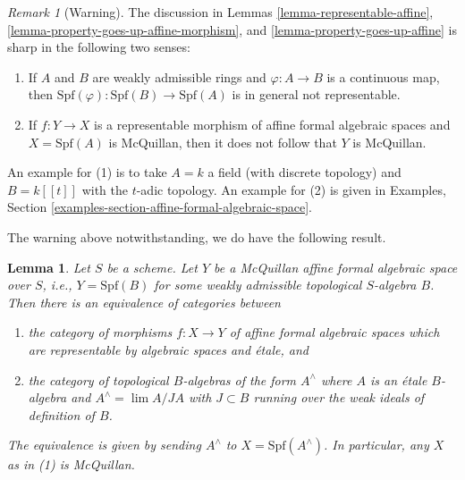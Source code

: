\documentclass{stacks-project}
\theoremstyle{plain}
\newtheorem{lemma}[subsection]{Lemma}
\theoremstyle{definition}
\theoremstyle{remark}
\newtheorem{remark}[subsection]{Remark}
\numberwithin{equation}{subsection}
\def\lim{\mathop{\mathrm{lim}}\nolimits}
\begin{document}
\begin{remark}[Warning]
\label{remark-warning}
The discussion in Lemmas \ref{lemma-representable-affine},
\ref{lemma-property-goes-up-affine-morphism}, and
\ref{lemma-property-goes-up-affine}
is sharp in the following two senses:
\begin{enumerate}
\item If $A$ and $B$ are weakly admissible rings and $\varphi : A \to B$
is a continuous map, then
$\text{Spf}(\varphi) : \text{Spf}(B) \to \text{Spf}(A)$ is in general
not representable.
\item If $f : Y \to X$ is a representable morphism of affine
formal algebraic spaces and $X = \text{Spf}(A)$ is McQuillan,
then it does not follow that $Y$ is McQuillan.
\end{enumerate}
An example for (1) is to take $A = k$ a field (with discrete topology)
and $B = k[[t]]$ with the $t$-adic topology.
An example for (2) is given in
Examples, Section \ref{examples-section-affine-formal-algebraic-space}.
\end{remark}

\noindent
The warning above notwithstanding, we do have the following result.

\begin{lemma}
\label{lemma-etale}
Let $S$ be a scheme. Let $Y$ be a McQuillan affine formal algebraic space
over $S$, i.e., $Y = \text{Spf}(B)$ for some weakly admissible topological
$S$-algebra $B$. Then there is an equivalence of categories between
\begin{enumerate}
\item the category of morphisms $f : X \to Y$
of affine formal algebraic spaces which are representable
by algebraic spaces and \'etale, and
\item the category of topological $B$-algebras of the form
$A^\wedge$ where $A$ is an \'etale $B$-algebra and
$A^\wedge = \lim A/JA$ with $J \subset B$ running over the
weak ideals of definition of $B$.
\end{enumerate}
The equivalence is given by sending $A^\wedge$ to  $X = \text{Spf}(A^\wedge)$.
In particular, any $X$ as in (1) is McQuillan.
\end{lemma}
\end{document}

